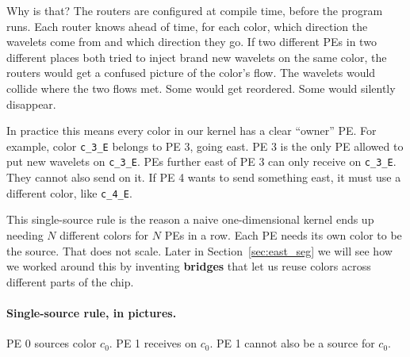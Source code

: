 \documentclass[11pt]{article}
\newcommand{\code}[1]{\texttt{#1}}
\begin{document}
Why is that? The routers are configured at compile time, before
the program runs. Each router knows ahead of time, for each
color, which direction the wavelets come from and which
direction they go. If two different PEs in two different places
both tried to inject brand new wavelets on the same color, the
routers would get a confused picture of the color's flow. The
wavelets would collide where the two flows met. Some would get
reordered. Some would silently disappear.

In practice this means every color in our kernel has a clear
``owner'' PE. For example, color \code{c\_3\_E} belongs to PE 3,
going east. PE 3 is the only PE allowed to put new wavelets on
\code{c\_3\_E}. PEs further east of PE 3 can only receive on
\code{c\_3\_E}. They cannot also send on it. If PE 4 wants to
send something east, it must use a different color, like
\code{c\_4\_E}.

This single-source rule is the reason a naive one-dimensional
kernel ends up needing $N$ different colors for $N$ PEs in a
row. Each PE needs its own color to be the source. That does
not scale. Later in Section~\ref{sec:east_seg} we will see how
we worked around this by inventing \textbf{bridges} that let us
reuse colors across different parts of the chip.

\paragraph{Single-source rule, in pictures.}

PE 0 sources color $c_0$. PE 1 receives on $c_0$. PE 1 cannot
also be a source for $c_0$.

\begin{center}
\end{center}
\end{document}
